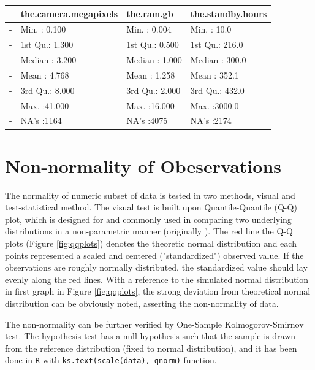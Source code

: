 \documentclass[utf8,english]{gradu3}
\begin{document}
\begin{table}[ht]
\centering
\begin{tabular}{rlll}
  \hline
 & the.camera.megapixels &   the.ram.gb & the.standby.hours \\ 
  \hline
- & Min.   : 0.100   & Min.   : 0.004   & Min.   :  10.0   \\ 
  - & 1st Qu.: 1.300   & 1st Qu.: 0.500   & 1st Qu.: 216.0   \\ 
  - & Median : 3.200   & Median : 1.000   & Median : 300.0   \\ 
  - & Mean   : 4.768   & Mean   : 1.258   & Mean   : 352.1   \\ 
  - & 3rd Qu.: 8.000   & 3rd Qu.: 2.000   & 3rd Qu.: 432.0   \\ 
  - & Max.   :41.000   & Max.   :16.000   & Max.   :3000.0   \\ 
  - & NA's   :1164   & NA's   :4075   & NA's   :2174   \\ 
   \hline
\end{tabular}
\end{table}

\section{Non-normality of Obeservations}
\label{app: normality}

The normality of numeric subset of data is tested in two methods, visual and test-statistical method. The visual test is built upon Quantile-Quantile (Q-Q) plot, which is designed for and commonly used in comparing two underlying distributions in a non-parametric manner (originally \cite{wilk1968probability}). The red line the Q-Q plots (Figure \ref{fig:qqplots}) denotes the theoretic normal distribution and each points represented a scaled and centered ("standardized") observed value. If the observations are roughly normally distributed, the standardized value should lay evenly along the red lines. With a reference to the simulated normal distribution in first graph in Figure \ref{fig:qqplots}, the strong deviation from theoretical normal distribution can be obviously noted, asserting the non-normality of data.

The non-normality can be further verified by One-Sample Kolmogorov-Smirnov test. The hypothesis test has a null hypothesis such that the sample is drawn from the reference distribution (fixed to normal distribution), and it has been done in \texttt{R} with \texttt{ks.text(scale(data), qnorm)} function. 
\end{document}
